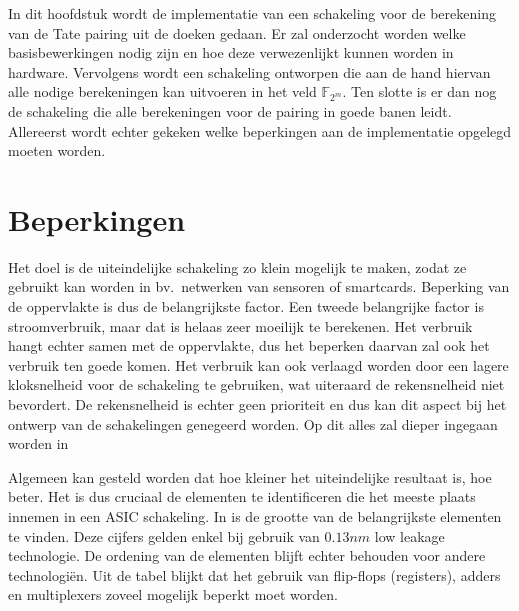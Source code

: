 \label{hfdst-implementatie}

In dit hoofdstuk wordt de implementatie van een schakeling voor de berekening van de Tate pairing uit de doeken gedaan. Er zal onderzocht worden welke basisbewerkingen nodig zijn en hoe deze verwezenlijkt kunnen worden in hardware. Vervolgens wordt een schakeling ontworpen die aan de hand hiervan alle nodige berekeningen kan uitvoeren in het veld $\mathbb{F}_{2^m}$. Ten slotte is er dan nog de schakeling die alle berekeningen voor de pairing in goede banen leidt. Allereerst wordt echter gekeken welke beperkingen aan de implementatie opgelegd moeten worden.

\section{Beperkingen}

Het doel is de uiteindelijke schakeling zo klein mogelijk te maken, zodat ze gebruikt kan worden in bv.\ netwerken van sensoren of smartcards. Beperking van de oppervlakte is dus de belangrijkste factor. Een tweede belangrijke factor is stroomverbruik, maar dat is helaas zeer moeilijk te berekenen. Het verbruik hangt echter samen met de oppervlakte, dus het beperken daarvan zal ook het verbruik ten goede komen. Het verbruik kan ook verlaagd worden door een lagere kloksnelheid voor de schakeling te gebruiken, wat uiteraard de rekensnelheid niet bevordert. De rekensnelheid is echter geen prioriteit en dus kan dit aspect bij het ontwerp van de schakelingen genegeerd worden. Op dit alles zal dieper ingegaan worden in 

Algemeen kan gesteld worden dat hoe kleiner het uiteindelijke resultaat is, hoe beter. Het is dus cruciaal de elementen te identificeren die het meeste plaats innemen in een ASIC schakeling. In  is de grootte van de belangrijkste elementen te vinden. Deze cijfers gelden enkel bij gebruik van $0.13 nm$ low leakage technologie. De ordening van de elementen blijft echter behouden voor andere technologi\"en. Uit de tabel blijkt dat het gebruik van flip-flops (registers), adders en multiplexers zoveel mogelijk beperkt moet worden.

